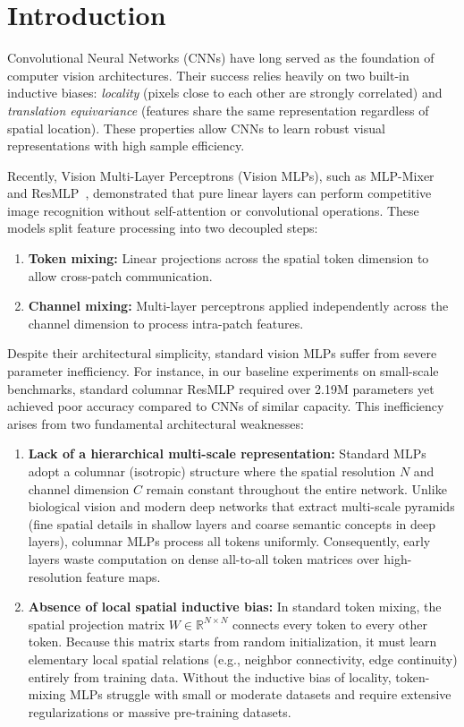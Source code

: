 \section{Introduction}
\label{section:introduction}

Convolutional Neural Networks (CNNs) have long served as the foundation of computer vision architectures. Their success relies heavily on two built-in inductive biases: \textit{locality} (pixels close to each other are strongly correlated) and \textit{translation equivariance} (features share the same representation regardless of spatial location). These properties allow CNNs to learn robust visual representations with high sample efficiency.

Recently, Vision Multi-Layer Perceptrons (Vision MLPs), such as MLP-Mixer~\cite{tolstikhin2021mlp} and ResMLP~\cite{touvron2021resmlp}, demonstrated that pure linear layers can perform competitive image recognition without self-attention or convolutional operations. These models split feature processing into two decoupled steps:
\begin{enumerate}
    \item \textbf{Token mixing:} Linear projections across the spatial token dimension to allow cross-patch communication.
    \item \textbf{Channel mixing:} Multi-layer perceptrons applied independently across the channel dimension to process intra-patch features.
\end{enumerate}

Despite their architectural simplicity, standard vision MLPs suffer from severe parameter inefficiency. For instance, in our baseline experiments on small-scale benchmarks, standard columnar ResMLP required over 2.19M parameters yet achieved poor accuracy compared to CNNs of similar capacity. This inefficiency arises from two fundamental architectural weaknesses:

\begin{enumerate}
    \item \textbf{Lack of a hierarchical multi-scale representation:} Standard MLPs adopt a columnar (isotropic) structure where the spatial resolution $N$ and channel dimension $C$ remain constant throughout the entire network. Unlike biological vision and modern deep networks that extract multi-scale pyramids (fine spatial details in shallow layers and coarse semantic concepts in deep layers), columnar MLPs process all tokens uniformly. Consequently, early layers waste computation on dense all-to-all token matrices over high-resolution feature maps.
    \item \textbf{Absence of local spatial inductive bias:} In standard token mixing, the spatial projection matrix $W \in \mathbb{R}^{N \times N}$ connects every token to every other token. Because this matrix starts from random initialization, it must learn elementary local spatial relations (e.g., neighbor connectivity, edge continuity) entirely from training data. Without the inductive bias of locality, token-mixing MLPs struggle with small or moderate datasets and require extensive regularizations or massive pre-training datasets.
\end{enumerate}

